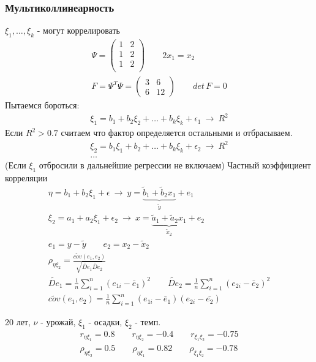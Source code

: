 \documentclass{article}
\begin{document}
\subsubsection{Мультиколлинеарность}
$\xi_1,\dots ,\xi_k$ - могут коррелировать
\begin{gather*}
  \Psi = \begin{pmatrix}
    1 & 2 \\
    1 & 2 \\
    1 & 2 \\
  \end{pmatrix} \qquad 2x_1=x_2 \\ 
  F=\Psi^{T}\Psi = \begin{pmatrix}
    3 & 6 \\ 
    6 & 12
  \end{pmatrix} \qquad det \, F =0
\end{gather*}
Пытаемся бороться:
\begin{gather*}
  \xi_1=b_1+b_2\xi_2 + \dots + b_k \xi_k + \epsilon_1 \ \rightarrow \ R^{2}
\end{gather*}
Если $R^{2} > 0.7$ считаем что фактор определяется остальными и отбрасываем.
\begin{gather*}
  \xi_2=b_1\xi_1+b_2 + \dots + b_k \xi_k + \epsilon_2 \ \rightarrow \ R^{2} \\ 
  \dots 
\end{gather*}
(Если $\xi_1$ отбросили в дальнейшие регрессии не включаем)
Частный коэффициент корреляции
\begin{gather*}
  \eta = b_1 + b_2\xi_1+\epsilon \ \rightarrow \ y=\underbrace{\tilde{b}_1+\tilde{b}_2x_1}_{\tilde{y}} + e_1\\ 
  \xi_2 = a_1 + a_2 \xi_1 + \epsilon_2\ \rightarrow \ x=\underbrace{\tilde{a}_1+\tilde{a}_2x_1}_{\tilde{x}_2} + e_2  \\ 
  e_{1} = y - \tilde{y} \qquad e_2 = x_2 - \tilde{x}_2 \\ 
  \rho_{\eta\xi_2}=\frac{\tilde{cov}(e_1,e_2)}{\sqrt{\tilde{De}_1\tilde{De}_2}} \\ 
  \tilde{De}_1 = \frac{1}{n}\sum_{i=1}^{n}(e_{1i}-\bar{e}_1)^{2} \qquad \tilde{De}_2 = \frac{1}{n}\sum_{i=1}^{n}(e_{2i}-\bar{e}_2)^{2} \\ 
  \tilde{cov}(e_1,e_2)=\frac{1}{n}\sum_{i=1}^{n}(e_{1i}-\bar{e}_1)(e_{2i}-\bar{e_2})
\end{gather*}
\begin{eg}
  20 лет, $\nu$ - урожай, $\xi_1$ - осадки, $\xi_2$ - темп.
  \begin{gather*}
    r_{\eta\xi_1}=0.8 \qquad r_{\eta\xi_2}=-0.4 \qquad r_{\xi_1\xi_2}=-0.75 \\ 
    \rho_{\eta\xi_2}=0.5 \qquad \rho_{\eta\xi_1}=0.82 \qquad \rho_{\xi_1\xi_2}=-0.78
  \end{gather*}
\end{eg}
\end{document}
